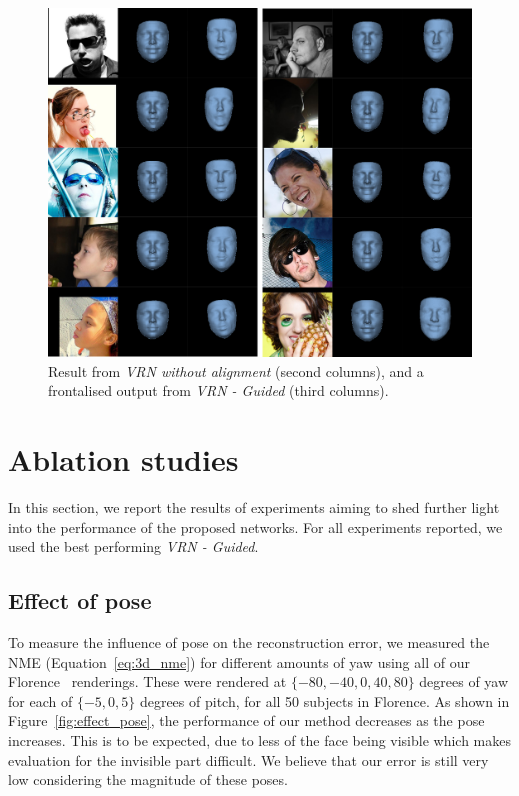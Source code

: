 \begin{figure}
  \centering
  \includegraphics[width=0.7\linewidth]{img/frontal.png}
  \caption[Visual results when spatial alignment is ignored]{Result from
    \textit{VRN without alignment} (second columns), and a frontalised
    output from \textit{VRN - Guided} (third columns).}
  \label{fig:frontal_visual}
\end{figure}

\section{Ablation studies}
\label{chapter:face:sec:ablation}

In this section, we report the results of experiments aiming to shed
further light into the performance of the proposed networks. For all
experiments reported, we used the best performing \textit{VRN -
  Guided}.

\subsection{Effect of pose}

To measure the influence of pose on the reconstruction error, we
measured the NME (Equation~\ref{eq:3d_nme}) for different amounts of
yaw using all of our Florence~\cite{masi2d3dFaceData}
renderings. These were rendered at $\{-80, -40, 0, 40, 80\}$ degrees
of yaw for each of $\{-5, 0, 5\}$ degrees of pitch, for all 50
subjects in Florence. As shown in Figure~\ref{fig:effect_pose}, the
performance of our method decreases as the pose increases. This is to
be expected, due to less of the face being visible which makes
evaluation for the invisible part difficult. We believe that our error
is still very low considering the magnitude of these poses.




